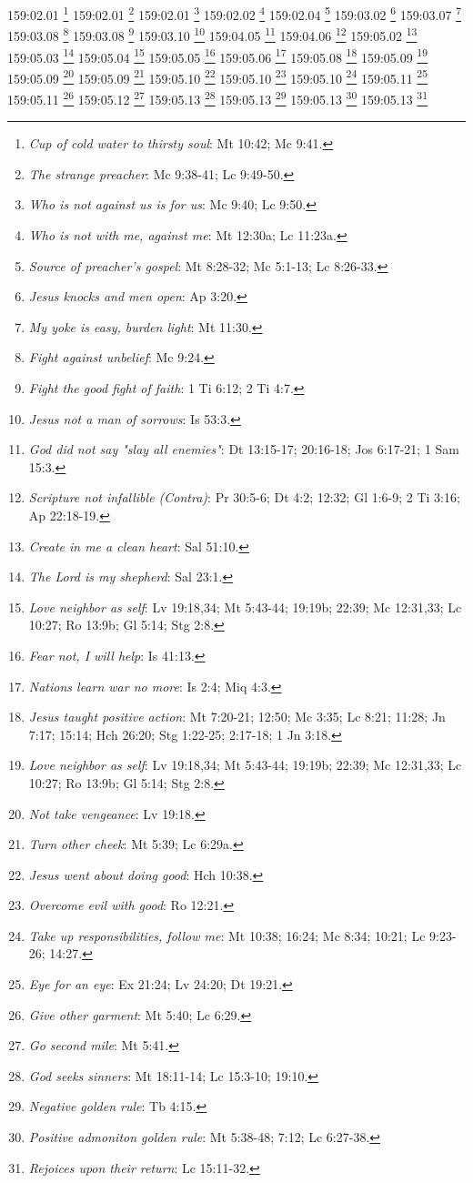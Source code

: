 159:02.01 \footnote{\textit{Cup of cold water to thirsty soul}: Mt 10:42; Mc 9:41.}
159:02.01 \footnote{\textit{The strange preacher}: Mc 9:38-41; Lc 9:49-50.}
159:02.01 \footnote{\textit{Who is not against us is for us}: Mc 9:40; Lc 9:50.}
159:02.02 \footnote{\textit{Who is not with me, against me}: Mt 12:30a; Lc 11:23a.}
159:02.04 \footnote{\textit{Source of preacher's gospel}: Mt 8:28-32; Mc 5:1-13; Lc 8:26-33.}
159:03.02 \footnote{\textit{Jesus knocks and men open}: Ap 3:20.}
159:03.07 \footnote{\textit{My yoke is easy, burden light}: Mt 11:30.}
159:03.08 \footnote{\textit{Fight against unbelief}: Mc 9:24.}
159:03.08 \footnote{\textit{Fight the good fight of faith}: 1 Ti 6:12; 2 Ti 4:7.}
159:03.10 \footnote{\textit{Jesus not a man of sorrows}: Is 53:3.}
159:04.05 \footnote{\textit{God did not say "slay all enemies"}: Dt 13:15-17; 20:16-18; Jos 6:17-21; 1 Sam 15:3.}
159:04.06 \footnote{\textit{Scripture not infallible (Contra)}: Pr 30:5-6; Dt 4:2; 12:32; Gl 1:6-9; 2 Ti 3:16; Ap 22:18-19.}
159:05.02 \footnote{\textit{Create in me a clean heart}: Sal 51:10.}
159:05.03 \footnote{\textit{The Lord is my shepherd}: Sal 23:1.}
159:05.04 \footnote{\textit{Love neighbor as self}: Lv 19:18,34; Mt 5:43-44; 19:19b; 22:39; Mc 12:31,33; Lc 10:27; Ro 13:9b; Gl 5:14; Stg 2:8.}
159:05.05 \footnote{\textit{Fear not, I will help}: Is 41:13.}
159:05.06 \footnote{\textit{Nations learn war no more}: Is 2:4; Miq 4:3.}
159:05.08 \footnote{\textit{Jesus taught positive action}: Mt 7:20-21; 12:50; Mc 3:35; Lc 8:21; 11:28; Jn 7:17; 15:14; Hch 26:20; Stg 1:22-25; 2:17-18; 1 Jn 3:18.}
159:05.09 \footnote{\textit{Love neighbor as self}: Lv 19:18,34; Mt 5:43-44; 19:19b; 22:39; Mc 12:31,33; Lc 10:27; Ro 13:9b; Gl 5:14; Stg 2:8.}
159:05.09 \footnote{\textit{Not take vengeance}: Lv 19:18.}
159:05.09 \footnote{\textit{Turn other cheek}: Mt 5:39; Lc 6:29a.}
159:05.10 \footnote{\textit{Jesus went about doing good}: Hch 10:38.}
159:05.10 \footnote{\textit{Overcome evil with good}: Ro 12:21.}
159:05.10 \footnote{\textit{Take up responsibilities, follow me}: Mt 10:38; 16:24; Mc 8:34; 10:21; Lc 9:23-26; 14:27.}
159:05.11 \footnote{\textit{Eye for an eye}: Ex 21:24; Lv 24:20; Dt 19:21.}
159:05.11 \footnote{\textit{Give other garment}: Mt 5:40; Lc 6:29.}
159:05.12 \footnote{\textit{Go second mile}: Mt 5:41.}
159:05.13 \footnote{\textit{God seeks sinners}: Mt 18:11-14; Lc 15:3-10; 19:10.}
159:05.13 \footnote{\textit{Negative golden rule}: Tb 4:15.}
159:05.13 \footnote{\textit{Positive admoniton golden rule}: Mt 5:38-48; 7:12; Lc 6:27-38.}
159:05.13 \footnote{\textit{Rejoices upon their return}: Lc 15:11-32.}
